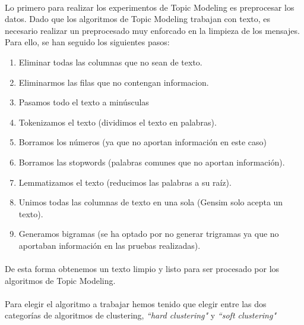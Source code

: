 \documentclass{report}
\begin{document}
{                \paragraph*{}{
                    Lo primero para realizar los experimentos de Topic Modeling es preprocesar los datos.
                    Dado que los algoritmos de Topic Modeling trabajan con texto, es necesario realizar un preprocesado muy enforcado en la limpieza de los mensajes.
                    Para ello, se han seguido los siguientes pasos:
                }
                \begin{enumerate}
                    \item Eliminar todas las columnas que no sean de texto.
                    \item Eliminarmos las filas que no contengan informacion.
                    \item Pasamos todo el texto a minúsculas
                    \item Tokenizamos el texto (dividimos el texto en palabras).
                    \item Borramos los números (ya que no aportan información en este caso)
                    \item Borramos las stopwords (palabras comunes que no aportan información).
                    \item Lemmatizamos el texto (reducimos las palabras a su raíz).
                    \item Unimos todas las columnas de texto en una sola (Gensim solo acepta un texto).
                    \item Generamos bigramas (se ha optado por no generar trigramas ya que no aportaban información en las pruebas realizadas).
                \end{enumerate}
                \paragraph*{}{
                    De esta forma obtenemos un texto limpio y listo para ser procesado por los algoritmos de Topic Modeling.
                }
                \paragraph*{}
                {
                    Para elegir el algoritmo a trabajar hemos tenido que elegir entre las dos categorías de algoritmos de clustering, \textit{``hard clustering"} y \textit{``soft clustering"}
                }
}
\end{document}
